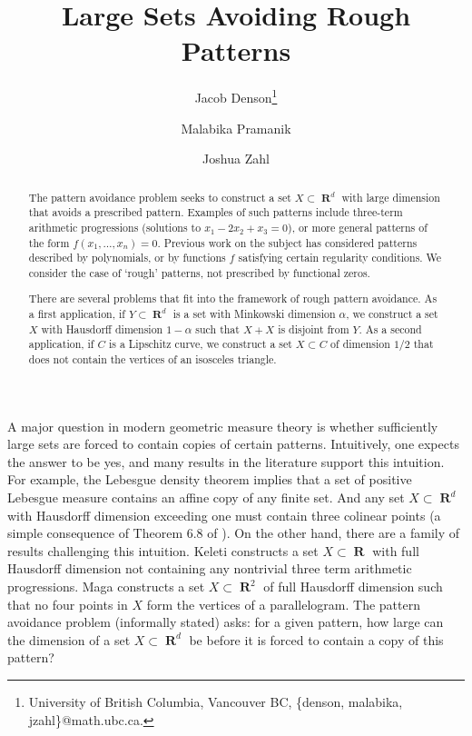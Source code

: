 \documentclass[dvipsnames,letterpaper,12pt]{article}
\title{Large Sets Avoiding Rough Patterns}
\author{Jacob Denson\thanks{University of British Columbia, Vancouver BC, \{denson, malabika, jzahl\}@math.ubc.ca.} \and Malabika Pramanik\footnotemark[1] \and Joshua Zahl\footnotemark[1]}
\numberwithin{equation}{section}
\theoremstyle{plain}
\theoremstyle{remark}
\DeclareMathOperator{\RR}{\mathbf{R}}
\begin{document}
\maketitle

\begin{abstract}
	The pattern avoidance problem seeks to construct a set $X\subset \RR^d$ with large dimension that avoids a prescribed pattern. Examples of such patterns include three-term arithmetic progressions (solutions to $x_1 - 2x_2 + x_3 = 0$), or more general patterns of the form $f(x_1, \dots, x_n) = 0$. Previous work on the subject has considered patterns described by polynomials, or by functions $f$ satisfying certain regularity conditions. We consider the case of `rough' patterns, not prescribed by functional zeros.

	There are several problems that fit into the framework of rough pattern avoidance. As a first application, if $Y \subset \RR^d$ is a set with Minkowski dimension $\alpha$, we construct a set $X$ with Hausdorff dimension $1-\alpha$ such that $X+X$ is disjoint from $Y$. As a second application, if $C$ is a Lipschitz curve, we construct a set $X \subset C$ of dimension $1/2$ that does not contain the vertices of an isosceles triangle.
\end{abstract}








A major question in modern geometric measure theory is whether sufficiently large sets are forced to contain copies of certain patterns. Intuitively, one expects the answer to be yes, and many results in the literature support this intuition. For example, the Lebesgue density theorem implies that a set of positive Lebesgue measure contains an affine copy of any finite set.
And any set $X \subset \RR^d$ with Hausdorff dimension exceeding one must contain three colinear points (a simple consequence of Theorem 6.8 of \cite{Matilla}). On the other hand, there are a family of results challenging this intuition.
Keleti \cite{KeletiDimOneSet} constructs a set $X \subset \RR$ with full Hausdorff dimension not containing any nontrivial three term arithmetic progressions. Maga \cite{Maga} constructs a set $X \subset \RR^2$ of full Hausdorff dimension such that no four points in $X$ form the vertices of a parallelogram. The pattern avoidance problem (informally stated) asks: for a given pattern, how large can the dimension of a set $X \subset \RR^d$ be before it is forced to contain a copy of this pattern? 
\end{document}
